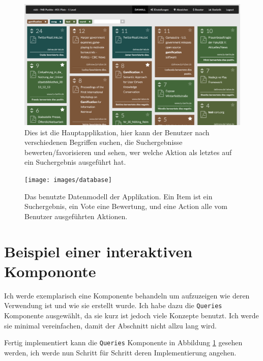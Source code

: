 \documentclass[12pt,twoside]{book}
\begin{document}
\begin{figure}[htbp]
    \centering
    \includegraphics[width=1.0\textwidth]{images/infoboard_wall.png}
    \caption{Dies ist die Hauptapplikation, hier kann der Benutzer nach verschiedenen Begriffen suchen, die Suchergebnisse bewerten/favorisieren und sehen, wer welche Aktion als letztes auf ein Suchergebnis ausgeführt hat.}\label{fig:wall}
\end{figure}


\begin{figure}[htbp]
	\centering
	\texttt{[image: images/database]}
	\caption{Das benutzte Datenmodell der Applikation. Ein Item ist ein Suchergebnis, ein Vote eine Bewertung, und eine Action alle vom Benutzer ausgeführten Aktionen.}
	\label{fig:database}
\end{figure}


\section*{Beispiel einer interaktiven Kompononte}\label{chap:appendix:component}

Ich werde exemplarisch eine Komponente behandeln um aufzuzeigen wie deren Verwendung ist und wie sie erstellt wurde. Ich habe dazu die \texttt{Queries} Komponente ausgewählt, da sie kurz ist jedoch viele Konzepte benutzt. Ich werde sie minimal vereinfachen, damit der Abschnitt nicht allzu lang wird.

Fertig implementiert kann die \texttt{Queries} Komponente in Abbildung \ref{fig:wall} gesehen werden, ich werde nun Schritt für Schritt deren Implementierung angehen.
\end{document}
